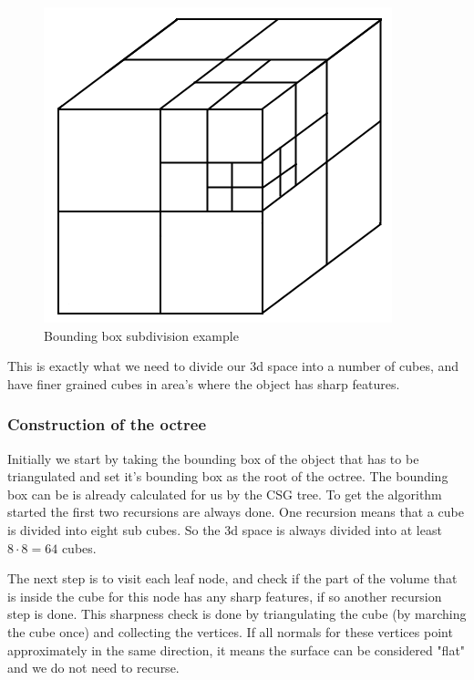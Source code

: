 \documentclass[a4paper,10pt,twocolumn]{article}
\begin{document}
    \begin{figure}[h]
        \begin{center}
            \includegraphics[scale=0.4]{./images/octree_block}
        \end{center}
        \caption{Bounding box subdivision example}
        \label{figure:octree}
    \end{figure}

This is exactly what we need to divide our 3d space into a number of cubes, and have finer grained cubes in area's where the object has sharp features.

\subsubsection{Construction of the octree}
\label{sect:genoctree}
Initially we start by taking the bounding box of the object that has to be triangulated and set it's bounding box as the root of the octree. The bounding box can be is already calculated for us by the CSG tree. To get the algorithm started the first two recursions are always done. One recursion means that a cube is divided into eight sub cubes. So the 3d space is always divided into at least $8 \cdot 8 = 64$ cubes.

The next step is to visit each leaf node, and check if the part of the volume that is inside the cube for this node has any sharp features, if so another recursion step is done. This sharpness check is done by triangulating the cube (by marching the cube once) and collecting the vertices. If all normals for these vertices point approximately in the same direction, it means the surface can be considered "flat" and we do not need to recurse.
\end{document}
